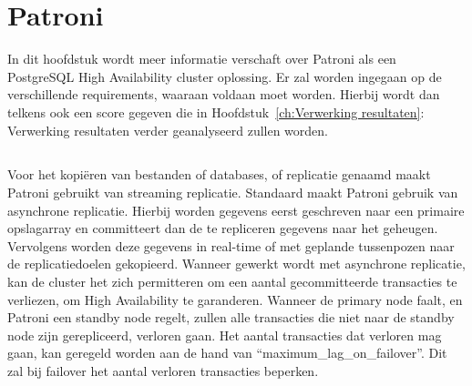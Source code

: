 \chapter{Patroni}
\label{ch:Patroni}

In dit hoofdstuk wordt meer informatie verschaft over Patroni als een PostgreSQL High Availability cluster oplossing. Er zal worden ingegaan op de verschillende requirements, waaraan voldaan moet worden. Hierbij wordt dan telkens ook een score gegeven die in Hoofdstuk~\ref{ch:Verwerking resultaten}: Verwerking resultaten verder geanalyseerd zullen worden.

\section{}
\label{sec:Inleiding tot Patroni}

\section{}
\label{sec:Requirements}

\subsection{}
\label{subsec:Must have}

\subsubsection{}
\label{subsubsec:Replicatie}

Voor het kopiëren van bestanden of databases, of replicatie genaamd maakt Patroni gebruikt van streaming replicatie. Standaard maakt Patroni gebruik van asynchrone replicatie. Hierbij worden gegevens eerst geschreven naar een primaire opslagarray en committeert dan de te repliceren gegevens naar het geheugen. Vervolgens worden deze gegevens in real-time of met geplande tussenpozen naar de replicatiedoelen gekopieerd.
Wanneer gewerkt wordt met asynchrone replicatie, kan de cluster het zich permitteren om een aantal gecommitteerde transacties te verliezen, om High Availability te garanderen. Wanneer de primary node faalt, en Patroni een standby node regelt, zullen alle transacties die niet naar de standby node zijn gerepliceerd, verloren gaan. Het aantal transacties dat verloren mag gaan, kan geregeld worden aan de hand van “maximum\_lag\_on\_failover”. Dit zal bij failover het aantal verloren transacties beperken.

